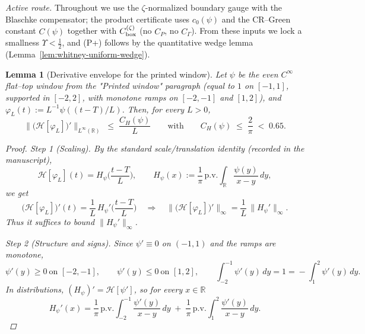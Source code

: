 \documentclass[11pt]{article}
\newtheorem{lemma}[theorem]{Lemma}
\theoremstyle{definition}
\theoremstyle{remark}
\begin{document}
\noindent\emph{Active route.} Throughout we use the $\zeta$-normalized boundary gauge with the Blaschke compensator; the product certificate uses $c_0(\psi)$ and the CR–Green constant $C(\psi)$ together with $C_{\rm box}^{(\zeta)}$ (no $C_P$, no $C_\Gamma$). From these inputs we lock a smallness $\Upsilon<\tfrac12$, and \textup{(P+)} follows by the quantitative wedge lemma (Lemma~\ref{lem:whitney-uniform-wedge}).


\begin{lemma}[Derivative envelope for the printed window]\label{lem:CH-derivative-explicit}
Let $\psi$ be the even $C^\infty$ flat--top window from the "Printed window" paragraph (equal to $1$ on $[-1,1]$, supported in $[-2,2]$, with monotone ramps on $[-2,-1]$ and $[1,2]$), and $\varphi_L(t):=L^{-1}\psi((t-T)/L)$. Then, for every $L>0$,
\[
  \big\|\big(\mathcal H[\varphi_L]\big)'\big\|_{L^\infty(\mathbb R)} \;\le\; \frac{C_H(\psi)}{L}
  \qquad\text{with}\qquad C_H(\psi)\;\le\;\frac{2}{\pi}\;<\;0.65.
\]
\begin{proof}
\textit{Step 1 (Scaling).} By the standard scale/translation identity (recorded in the manuscript),
\[
  \mathcal H[\varphi_L](t)=H_\psi\!\Big(\frac{t-T}{L}\Big),\qquad
  H_\psi(x):=\frac{1}{\pi}\,\mathrm{p.v.}\!\int_{\mathbb R}\frac{\psi(y)}{x-y}\,dy,
\]
we get
\[
  \big(\mathcal H[\varphi_L]\big)'(t)=\frac{1}{L}\,H_\psi'\!\Big(\frac{t-T}{L}\Big)
  \quad\Longrightarrow\quad
  \big\|\big(\mathcal H[\varphi_L]\big)'\big\|_\infty=\frac{1}{L}\,\|H_\psi'\|_\infty.
\]
Thus it suffices to bound $\|H_\psi'\|_\infty$.

\smallskip
\textit{Step 2 (Structure and signs).} Since $\psi'\equiv0$ on $(-1,1)$ and the ramps are monotone,
\[
  \psi'(y)\ge0\ \text{on }[-2,-1],\qquad \psi'(y)\le0\ \text{on }[1,2],\qquad
  \int_{-2}^{-1}\psi'(y)\,dy=1=\!-\!\int_{1}^{2}\psi'(y)\,dy.
\]
In distributions, $(H_\psi)'= \mathcal H[\psi']$, so for every $x\in\mathbb R$
\[
  H_\psi'(x)=\frac{1}{\pi}\,\mathrm{p.v.}\!\int_{-2}^{-1}\frac{\psi'(y)}{x-y}\,dy\;+\;
             \frac{1}{\pi}\,\mathrm{p.v.}\!\int_{1}^{2}\frac{\psi'(y)}{x-y}\,dy.
\]


\end{proof}
\end{lemma}
\end{document}
